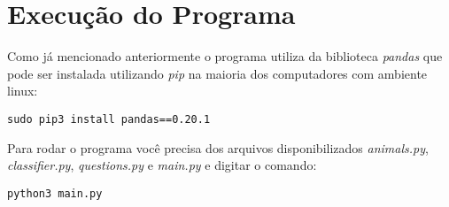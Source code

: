 \documentclass{article}
\begin{document}
\pagebreak


\section{Execução do Programa}

Como já mencionado anteriormente o programa utiliza da biblioteca \textit{pandas} que pode ser instalada utilizando \textit{pip} na maioria dos computadores com ambiente linux:

\begin{verbatim}
sudo pip3 install pandas==0.20.1
\end{verbatim}

Para rodar o programa você precisa dos arquivos disponibilizados \textit{animals.py}, \textit{classifier.py}, \textit{questions.py} e \textit{main.py} e digitar o comando:

\begin{verbatim}
python3 main.py
\end{verbatim}
\end{document}
